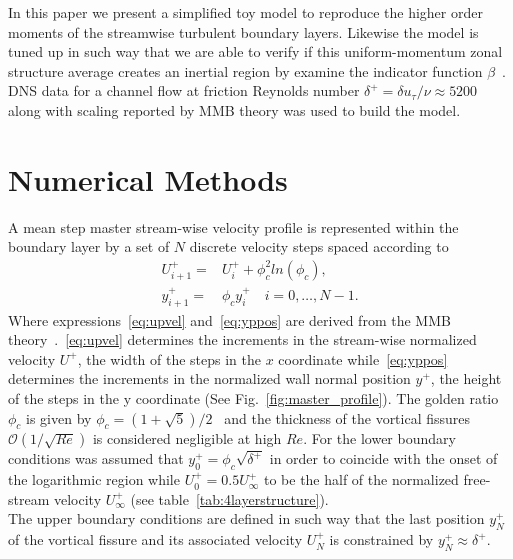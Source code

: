 \documentclass[aps,reprint,amsmath,amssymb,pra]{revtex4-1}%
\begin{document}
In this paper we present a simplified toy model to reproduce the higher order moments of the streamwise turbulent boundary layers. Likewise the model is tuned up in such way that we are able to verify if this uniform-momentum zonal structure average creates an inertial region by examine the indicator function $\beta$~\cite{}. DNS data for a channel flow at friction Reynolds number $\delta^+=\delta u_{\tau}/\nu\approx 5200$ ~\cite{leemoser2015}  along with scaling reported by MMB theory was used to build the model. 

\section{\label{sec:nm} Numerical Methods}
A  mean step master stream-wise velocity profile is represented within the boundary layer by a set of $N$ discrete velocity steps spaced according to  
\begin{align}
U^+_{i+1}=&U^+_i+\phi_c^2 ln(\phi_c) \label{eq:upvel},\\
y^+_{i+1}=&\phi_c y^+_i\quad i=0,\ldots ,N-1. \label{eq:yppos}
\end{align}
Where expressions~\eqref{eq:upvel} and~\eqref{eq:yppos} are derived from the MMB theory~\citep{Klewickimmb}.~\eqref{eq:upvel} determines the increments in the stream-wise normalized velocity $U^+$, the width of the steps in the $x$ coordinate while~\eqref{eq:yppos} determines the increments in the normalized wall normal position $y^+$, the height of the steps in the y coordinate (See Fig.~\ref{fig:master_profile}). The golden ratio $\phi_c$ is given by $\phi_c=(1+\sqrt{5})/2$~\cite{klewicki2014} and the thickness of the
vortical fissures $\mathcal{O}(1/\sqrt{Re})$ is considered negligible at high $Re$. For the lower boundary conditions was assumed that $y^+_0=\phi_c\sqrt{\delta^+}$ in order to coincide with the onset of the logarithmic region  while $U^+_0=0.5 U_{\infty}^+$ to be the half of the normalized free-stream velocity $U_{\infty}^+$ (see table~\ref{tab:4layerstructure}). \\  
The upper boundary conditions are defined in such way that the last position $y_{N}^+$ of the vortical fissure and its associated velocity $U^+_{N}$ is constrained by $y_{N}^+\approx\delta^+$.\\
\end{document}
